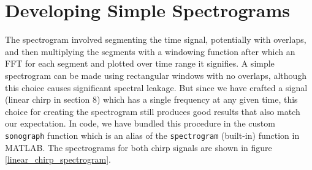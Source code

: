 \documentclass[10pt]{article}
\begin{document}
\section{Developing Simple Spectrograms}
The spectrogram involved segmenting the time signal, potentially with overlaps, and then multiplying the segments with a windowing function after which an FFT for each segment and plotted over time range it signifies. A simple spectrogram can be made using rectangular windows with no overlaps, although this choice causes significant spectral leakage. But since we have crafted a signal (linear chirp in section 8) which has a single frequency at any given time, this choice for creating the spectrogram still produces good results that also match our expectation. In code, we have bundled this procedure in the custom \texttt{sonograph} function which is an alias of the \texttt{spectrogram} (built-in) function in \textsc{MATLAB}. The spectrograms for both chirp signals are shown in figure \ref{linear_chirp_spectrogram}.
\end{document}
